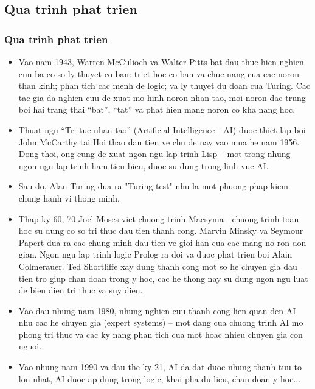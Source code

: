 \documentclass[12pt]{beamer}
\begin{document}
\subsection{Qua trinh phat trien}
\begin{frame}
\frametitle{Qua trinh phat trien}
\begin{itemize}
\item{Vao nam 1943, Warren McCulioch va Walter Pitts bat dau thuc hien nghien cuu ba co so ly thuyet co ban: triet hoc co ban va chuc nang cua cac noron than kinh; phan tich cac menh de logic; va ly thuyet du doan cua Turing. Cac tac gia da nghien cuu de xuat mo hinh noron nhan tao, moi noron dac trung boi hai trang thai “bat”, “tat” va phat hien mang noron co kha nang hoc.} 
\item{Thuat ngu “Tri tue nhan tao” (Artificial Intelligence - AI) duoc thiet lap boi John McCarthy tai Hoi thao dau tien ve chu de nay vao mua he nam 1956. Dong thoi, ong cung de xuat ngon ngu lap trinh Lisp – mot trong nhung ngon ngu lap trinh ham tieu bieu, duoc su dung trong linh vuc AI.}
\item{Sau do, Alan Turing dua ra "Turing test" nhu la mot phuong phap kiem chung hanh vi thong minh.}
\end{itemize}
\end{frame}
\begin{frame}
\begin{itemize}
\frametitle{Qua trinh phat trien}
\item{Thap ky 60, 70 Joel Moses viet chuong trinh Macsyma - chuong trinh toan hoc su dung co so tri thuc dau tien thanh cong. Marvin Minsky va Seymour Papert dua ra cac chung minh dau tien ve gioi han cua cac mang no-ron don gian. Ngon ngu lap trinh logic Prolog ra doi va duoc phat trien boi Alain Colmerauer. Ted Shortliffe xay dung thanh cong mot so he chuyen gia dau tien tro giup chan doan trong y hoc, cac he thong nay su dung ngon ngu luat de bieu dien tri thuc va suy dien.}
\item{Vao dau nhung nam 1980, nhung nghien cuu thanh cong lien quan den AI nhu cac he chuyen gia (expert systems) – mot dang cua chuong trinh AI mo phong tri thuc va cac ky nang phan tich cua mot hoac nhieu chuyen gia con nguoi.}
\item{Vao nhung nam 1990 va dau the ky 21, AI da dat duoc nhung thanh tuu to lon nhat, AI duoc ap dung trong logic, khai pha du lieu, chan doan y hoc... } 
\end{itemize}
\end{frame}
\end{document}
